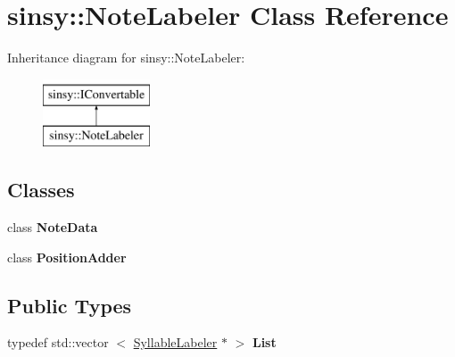 \hypertarget{classsinsy_1_1NoteLabeler}{\section{sinsy\-:\-:\-Note\-Labeler \-Class \-Reference}
\label{classsinsy_1_1NoteLabeler}
}
\-Inheritance diagram for sinsy\-:\-:\-Note\-Labeler\-:\begin{figure}[H]
\begin{center}
\leavevmode
\includegraphics[height=2.000000cm]{classsinsy_1_1NoteLabeler}
\end{center}
\end{figure}
\subsection*{\-Classes}
\begin{DoxyCompactItemize}
\item 
class {\bfseries \-Note\-Data}
\item 
class {\bfseries \-Position\-Adder}
\end{DoxyCompactItemize}
\subsection*{\-Public \-Types}
\begin{DoxyCompactItemize}
\item 
\hypertarget{classsinsy_1_1NoteLabeler_a3cac0931abc74e5d2af1321739c66530}{typedef std\-::vector\*
$<$ \hyperlink{classsinsy_1_1SyllableLabeler}{\-Syllable\-Labeler} $\ast$ $>$ {\bfseries \-List}}\label{classsinsy_1_1NoteLabeler_a3cac0931abc74e5d2af1321739c66530}

\end{DoxyCompactItemize}
